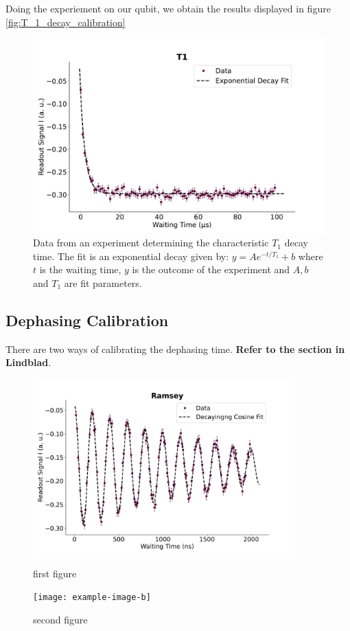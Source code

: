 Doing the experiement on our qubit, we obtain the results displayed in figure \ref{fig:T_1_decay_calibration}

\begin{figure}
    \centering
    \includegraphics[]{Calibrations/Figures/T1.pdf}
    \caption{Data from an experiment determining the characteristic $T_1$ decay time. The fit is an exponential decay given by: $y = A e^{-t / T_1} + b$ where $t$ is the waiting time, $y$ is the outcome of the experiment and $A, b$ and $T_1$ are fit parameters.}
    \label{fig:calibration_T_1_decay}
\end{figure}

\subsection{Dephasing Calibration}
There are two ways of calibrating the dephasing time. \textbf{Refer to the section in Lindblad}.

\begin{figure}
    \begin{minipage}{0.45\textwidth}
        \centering
        \includegraphics[width=0.9\textwidth]{Calibrations/Figures/Ramsey.pdf} %
        \caption{first figure}
    \end{minipage}\hfill
    \begin{minipage}{0.45\textwidth}
        \centering
        \texttt{[image: example-image-b]} %
        \caption{second figure}
    \end{minipage}
\end{figure}

